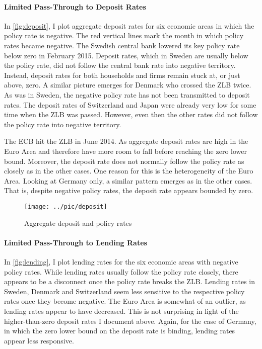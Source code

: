 \paragraph{Limited Pass-Through to Deposit Rates}
In \autoref{fig:deposit}, I plot aggregate deposit rates for six economic areas in which the policy rate is negative. The red vertical lines mark the month in which policy rates became negative. The Swedish central bank lowered its key policy rate below zero in February 2015. Deposit rates, which in Sweden are usually below the policy rate, did not follow the central bank rate into negative territory. Instead, deposit rates for both households and firms remain stuck at, or just above, zero. A similar picture emerges for Denmark who crossed the ZLB twice. As was in Sweden, the negative policy rate has not been transmitted to deposit rates.
The deposit rates of Switzerland  and Japan were already very low for some time when the ZLB was passed. However, even then the other rates did not follow the policy rate into negative territory.

The ECB hit the ZLB in June 2014. As aggregate deposit rates are high in the Euro Area and therefore have more room to fall before reaching the zero lower bound. Moreover, the deposit rate does not normally follow the policy rate as closely as in the other cases. One reason for this is the heterogeneity of the Euro Area. Looking at Germany only, a similar pattern emerges as in the other cases. That is, despite negative policy rates, the deposit rate appears bounded by zero. 


\begin{figure}
	\begin{center}
		\texttt{[image: ../pic/deposit]}
	\end{center}
	\caption{Aggregate deposit and policy rates}	
	\label{fig:deposit}
\end{figure}


\paragraph{Limited Pass-Through to Lending Rates}
In \autoref{fig:lending}, I plot lending rates for the six economic areas with negative policy rates. While lending
rates usually follow the policy rate closely, there appears to be a disconnect once the policy
rate breaks the ZLB. Lending rates in Sweden, Denmark and Switzerland seem less sensitive to the respective policy rates once they become negative. 
The Euro Area is somewhat of an outlier, as lending rates appear to have decreased. This is not surprising in light of the higher-than-zero deposit rates I document above. Again, for the case of
Germany, in which the zero lower bound on the deposit rate is binding, lending rates appear
less responsive.

